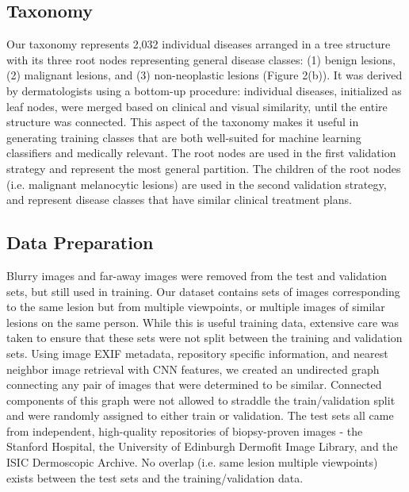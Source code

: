 \subsection{Taxonomy}
Our taxonomy represents 2,032 individual diseases arranged in a tree structure with its three root nodes representing general disease classes: (1) benign lesions, (2) malignant lesions, and (3) non-neoplastic lesions (Figure 2(b)). It was derived by dermatologists using a bottom-up procedure: individual diseases, initialized as leaf nodes, were merged based on clinical and visual similarity, until the entire structure was connected. This aspect of the taxonomy makes it useful in generating training classes that are both well-suited for machine learning classifiers and medically relevant. The root nodes are used in the first validation strategy and represent the most general partition. The children of the root nodes (i.e. malignant melanocytic lesions) are used in the second validation strategy, and represent disease classes that have similar clinical treatment plans.

\subsection{Data Preparation}
Blurry images and far-away images were removed from the test and validation sets, but still used in training. Our dataset contains sets of images corresponding to the same lesion but from multiple viewpoints, or multiple images of similar lesions on the same person. While this is useful training data, extensive care was taken to ensure that these sets were not split between the training and validation sets. Using image EXIF metadata, repository specific information, and nearest neighbor image retrieval with CNN features, we created an undirected graph connecting any pair of images that were determined to be similar. Connected components of this graph were not allowed to straddle the train/validation split and were randomly assigned to either train or validation. The test sets all came from independent, high-quality repositories of biopsy-proven images - the Stanford Hospital, the University of Edinburgh Dermofit Image Library, and the ISIC Dermoscopic Archive. No overlap (i.e. same lesion multiple viewpoints) exists between the test sets and the training/validation data.

